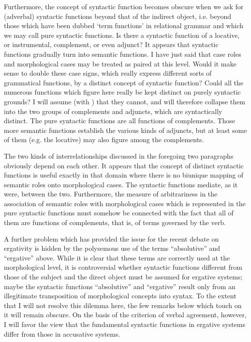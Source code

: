 Furthermore, the concept of syntactic function becomes obscure when we ask for (adverbal) syntactic functions beyond that of the indirect object, i.e. beyond those which have been dubbed ‘term functions’ in relational grammar and which we may call pure syntactic functions. Is there a syntactic function of a locative, or instrumental, complement, or even adjunct? It appears that syntactic functions gradually turn into semantic functions. I have just said that case roles and morphological cases may be treated as paired at this level. Would it make sense to double these case signs, which really express different sorts of grammatical functions, by a distinct concept of syntactic function? Could all the numerous functions which figure here really be kept distinct on purely syntactic grounds? I will assume (with \citealt[17--21]{Matthews1981}) that they cannot, and will therefore collapse them into the two groups of complements and adjuncts, which are syntactically distinct. The pure syntactic functions are all functions of complements. Those more semantic functions establish the various kinds of adjuncts, but at least some of them (e.g. the locative) may also figure among the complements.

The two kinds of interrelationships discussed in the foregoing two paragraphs obviously depend on each other. It appears that the concept of distinct syntactic functions is useful exactly in that domain where there is no biunique mapping of semantic roles onto morphological cases. The syntactic functions mediate, as it were, between the two. Furthermore, the measure of arbitrariness in the association of semantic roles with morphological cases which is represented in the pure syntactic functions must somehow be connected with the fact that all of them are functions of complements, that is, of terms governed by the verb.

A further problem which has provided the issue for the recent debate on ergativity is hidden by the polysemous use of the terms ``absolutive'' and ``ergative'' above. While it is clear that these terms are correctly used at the morphological level, it is controversial whether syntactic functions different from those of the subject and the direct object must be assumed for ergative systems; maybe the syntactic functions ``absolutive'' and ``ergative'' result only from an illegitimate transposition of morphological concepts into syntax. To the extent that I will not resolve this dilemma here, the few remarks below which touch on it will remain obscure. On the basis of the criterion of verbal agreement, however, I will favor the view that the fundamental syntactic functions in ergative systems differ from those in accusative systems.

